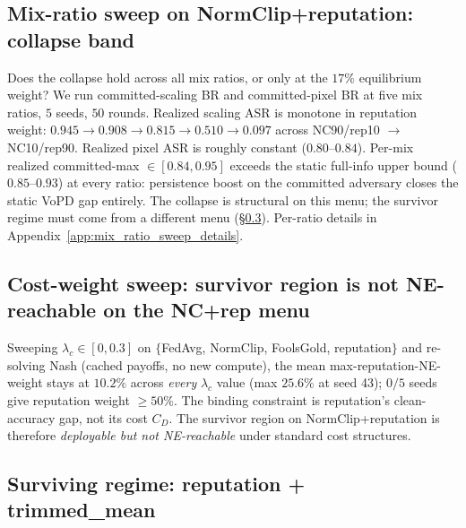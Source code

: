 \documentclass{article}
\begin{document}
\subsection{Mix-ratio sweep on NormClip+reputation: collapse band}
\label{sec:mix_ratio_sweep}

Does the collapse hold across all mix ratios, or only at the $17\%$ equilibrium weight? We run committed-scaling BR and committed-pixel BR at five mix ratios, $5$ seeds, $50$ rounds. Realized scaling ASR is monotone in reputation weight: $0.945 \to 0.908 \to 0.815 \to 0.510 \to \mathbf{0.097}$ across NC90/rep10 $\to$ NC10/rep90. Realized pixel ASR is roughly constant ($0.80$--$0.84$). Per-mix realized committed-max $\in [0.84, 0.95]$ exceeds the static full-info upper bound ($0.85$--$0.93$) at every ratio: persistence boost on the committed adversary closes the static VoPD gap entirely. The collapse is structural on this menu; the survivor regime must come from a different menu (§\ref{sec:rep_tm_survivor}). Per-ratio details in Appendix~\ref{app:mix_ratio_sweep_details}.

\subsection{Cost-weight sweep: survivor region is not NE-reachable on the NC+rep menu}
\label{sec:lambda_c_sweep}

Sweeping $\lambda_c \in [0, 0.3]$ on $\{$FedAvg, NormClip, FoolsGold, reputation$\}$ and re-solving Nash (cached payoffs, no new compute), the mean max-reputation-NE-weight stays at $10.2\%$ across \emph{every} $\lambda_c$ value (max $25.6\%$ at seed 43); $0/5$ seeds give reputation weight $\geq 50\%$. The binding constraint is reputation's clean-accuracy gap, not its cost $C_D$. The survivor region on NormClip+reputation is therefore \emph{deployable but not NE-reachable} under standard cost structures.

\subsection{Surviving regime: reputation + trimmed\_mean}
\label{sec:rep_tm_survivor}
\end{document}
